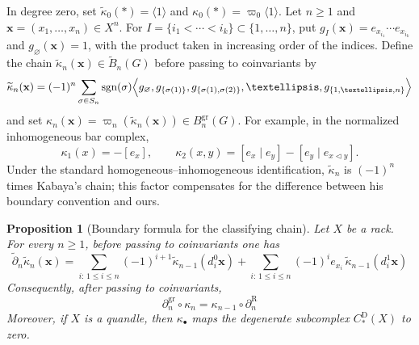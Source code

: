 \documentclass[10pt,a4paper]{amsart}
\newtheorem{proposition}[theorem]{Proposition}
\DeclareMathOperator{\sgn}{sgn}
\newcommand{\tB}{\widetilde B}
\newcommand{\tkap}{\widetilde\kappa}
\newcommand{\td}{\widetilde\partial}
\newcommand{\gr}{\mathrm{gr}}
\newcommand{\R}{\mathrm R}
\newcommand{\D}{\mathrm D}
\begin{document}
In degree zero, set $\tkap_0(*)=\langle1\rangle$ and $\kappa_0(*)=\varpi_0\langle1\rangle$. Let $n\ge1$ and $\mathbf x=(x_1,\ldots,x_n)\in X^n$. For $I=\{i_1<\cdots<i_k\}\subset\{1,\ldots,n\}$, put $g_I(\mathbf x)=e_{x_{i_1}}\cdots e_{x_{i_k}}$ and $g_\varnothing(\mathbf x)=1$, with the product taken in increasing order of the indices. Define the chain $\tkap_n(\mathbf x)\in\tB_n(G)$ before passing to coinvariants by
\begin{equation}
\tkap_n(\mathbf x)
=
(-1)^n
\sum_{\sigma\in S_n}\sgn(\sigma)
\Bigl\langle
        g_\varnothing,
        g_{\{\sigma(1)\}},
        g_{\{\sigma(1),\sigma(2)\}},
        \ldots,
        g_{\{1,\ldots,n\}}
\Bigr\rangle
\label{eq:kappa-definition}
\end{equation}
and set $\kappa_n(\mathbf x)=\varpi_n(\tkap_n(\mathbf x))\in B_n^{\gr}(G)$. For example, in the normalized inhomogeneous bar complex,
\[
 \kappa_1(x)=-[e_x],
 \qquad
 \kappa_2(x,y)=[e_x\mid e_y]-[e_y\mid e_{x\lhd y}].
\]
Under the standard homogeneous--inhomogeneous identification, $\tkap_n$ is $(-1)^n$ times Kabaya's chain; this factor compensates for the difference between his boundary convention and ours.

\begin{proposition}[Boundary formula for the classifying chain]
\label{prop:kappa-boundary}
Let $X$ be a rack. For every $n\ge1$, before passing to coinvariants one has
\begin{equation}
\td_n\tkap_n(\mathbf x)
=
\sum_{i:\,1\le i\le n}(-1)^{i+1}\tkap_{n-1}(d_i^0\mathbf x)
+
\sum_{i:\,1\le i\le n}(-1)^i e_{x_i}\,\tkap_{n-1}(d_i^1\mathbf x)
\label{eq:kappa-homogeneous-boundary}
\end{equation}
Consequently, after passing to coinvariants,
\begin{equation}
        \partial_n^{\gr} \circ  \kappa_n
        =
        \kappa_{n-1} \circ \partial_n^\R
\label{eq:kappa-chain-map}
\end{equation}
Moreover, if $X$ is a quandle, then $\kappa_\bullet$ maps the degenerate subcomplex $C_*^\D(X)$ to zero.
\end{proposition}
\end{document}
